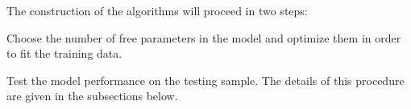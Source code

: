 The construction of the algorithms will proceed in two steps:
\bi
\item
Choose the number of free parameters in the model and optimize them in order to fit the training data.
\item
Test the model performance on the testing sample.
\ei
The details of this procedure are given in the subsections below.

